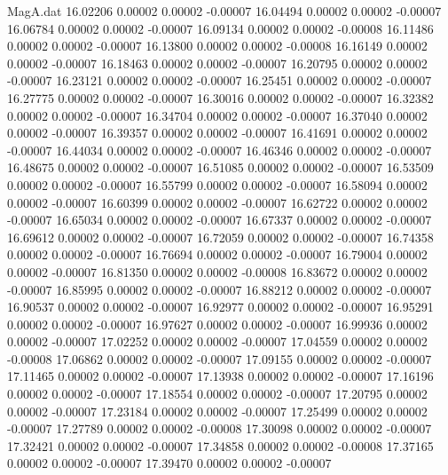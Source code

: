 \begin{filecontents}{MagA.dat}
  16.02206    0.00002    0.00002   -0.00007
  16.04494    0.00002    0.00002   -0.00007
  16.06784    0.00002    0.00002   -0.00007
  16.09134    0.00002    0.00002   -0.00008
  16.11486    0.00002    0.00002   -0.00007
  16.13800    0.00002    0.00002   -0.00008
  16.16149    0.00002    0.00002   -0.00007
  16.18463    0.00002    0.00002   -0.00007
  16.20795    0.00002    0.00002   -0.00007
  16.23121    0.00002    0.00002   -0.00007
  16.25451    0.00002    0.00002   -0.00007
  16.27775    0.00002    0.00002   -0.00007
  16.30016    0.00002    0.00002   -0.00007
  16.32382    0.00002    0.00002   -0.00007
  16.34704    0.00002    0.00002   -0.00007
  16.37040    0.00002    0.00002   -0.00007
  16.39357    0.00002    0.00002   -0.00007
  16.41691    0.00002    0.00002   -0.00007
  16.44034    0.00002    0.00002   -0.00007
  16.46346    0.00002    0.00002   -0.00007
  16.48675    0.00002    0.00002   -0.00007
  16.51085    0.00002    0.00002   -0.00007
  16.53509    0.00002    0.00002   -0.00007
  16.55799    0.00002    0.00002   -0.00007
  16.58094    0.00002    0.00002   -0.00007
  16.60399    0.00002    0.00002   -0.00007
  16.62722    0.00002    0.00002   -0.00007
  16.65034    0.00002    0.00002   -0.00007
  16.67337    0.00002    0.00002   -0.00007
  16.69612    0.00002    0.00002   -0.00007
  16.72059    0.00002    0.00002   -0.00007
  16.74358    0.00002    0.00002   -0.00007
  16.76694    0.00002    0.00002   -0.00007
  16.79004    0.00002    0.00002   -0.00007
  16.81350    0.00002    0.00002   -0.00008
  16.83672    0.00002    0.00002   -0.00007
  16.85995    0.00002    0.00002   -0.00007
  16.88212    0.00002    0.00002   -0.00007
  16.90537    0.00002    0.00002   -0.00007
  16.92977    0.00002    0.00002   -0.00007
  16.95291    0.00002    0.00002   -0.00007
  16.97627    0.00002    0.00002   -0.00007
  16.99936    0.00002    0.00002   -0.00007
  17.02252    0.00002    0.00002   -0.00007
  17.04559    0.00002    0.00002   -0.00008
  17.06862    0.00002    0.00002   -0.00007
  17.09155    0.00002    0.00002   -0.00007
  17.11465    0.00002    0.00002   -0.00007
  17.13938    0.00002    0.00002   -0.00007
  17.16196    0.00002    0.00002   -0.00007
  17.18554    0.00002    0.00002   -0.00007
  17.20795    0.00002    0.00002   -0.00007
  17.23184    0.00002    0.00002   -0.00007
  17.25499    0.00002    0.00002   -0.00007
  17.27789    0.00002    0.00002   -0.00008
  17.30098    0.00002    0.00002   -0.00007
  17.32421    0.00002    0.00002   -0.00007
  17.34858    0.00002    0.00002   -0.00008
  17.37165    0.00002    0.00002   -0.00007
  17.39470    0.00002    0.00002   -0.00007

\end{filecontents}
